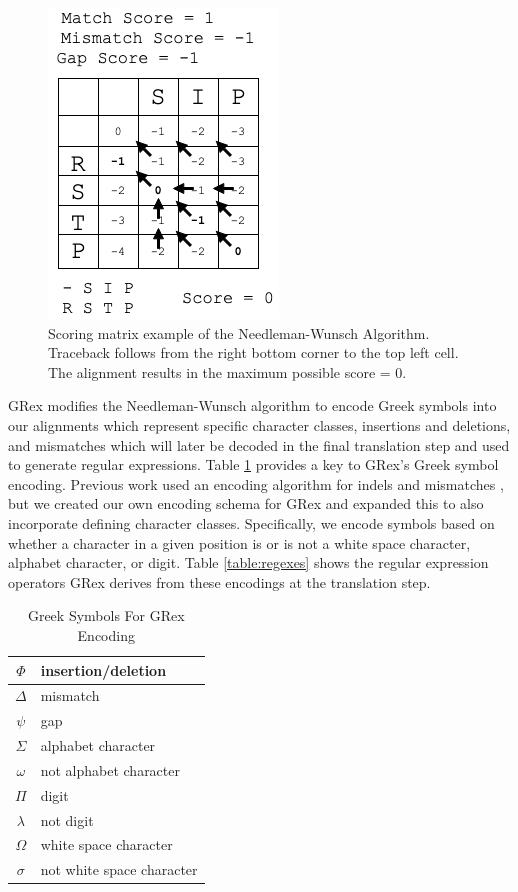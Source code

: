 \begin{figure}[hbt!]
  \begin{center}
    \includegraphics[width=0.3\columnwidth]{chapters/3/img/needlemanwunsch.png}
    \caption{Scoring matrix example of the Needleman-Wunsch Algorithm. Traceback follows from the right bottom corner to the top left cell. The alignment results in the maximum possible score = 0.}
    \label{f:needlemanwunsch}
  \end{center}
\end{figure}

GRex modifies the Needleman-Wunsch algorithm to encode Greek symbols into our alignments which represent specific character classes, insertions and deletions, and mismatches which will later be decoded in the final translation step and used to generate regular expressions. Table \ref{table:greekencoding} provides a key to GRex's Greek symbol encoding. Previous work used an encoding algorithm for indels and mismatches \cite{WANG2012992}, but we created our own encoding schema for GRex and expanded this to also incorporate defining character classes. Specifically, we encode symbols based on whether a character in a given position is or is not a white space character, alphabet character, or digit. Table \ref{table:regexes} shows the regular expression operators GRex derives from these encodings at the translation step.

\begin{table}
\begin{center}
\begin{tabular}{|c | l|}
  \hline
  $\Phi$ & insertion/deletion \\
  \hline
  $\Delta$ & mismatch \\
  \hline
  $\psi$ & gap \\
  \hline
  $\Sigma$ & alphabet character \\
  \hline
  $\omega$ & not alphabet character\\
  \hline
  $\Pi$ & digit \\
  \hline
  $\lambda$ & not digit \\
  \hline
  $\Omega$ & white space character \\
  \hline
  $\sigma$ & not white space character \\
  \hline
\end{tabular}
\caption{Greek Symbols For GRex Encoding}
\label{table:greekencoding}
\end{center}
\end{table}

